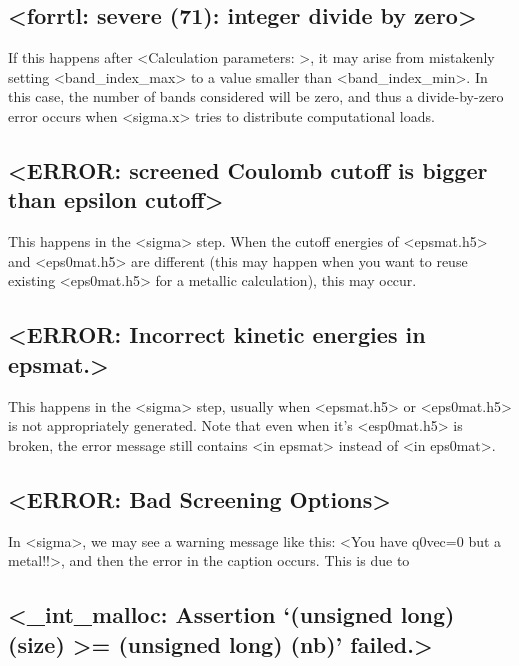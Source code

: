 \documentclass[hyperref, a4paper, 12pt]{report}
\def\texttt#1{<#1>}%
\newcommand{\shortcode}[1]{\texttt{#1}}
\begin{document}
\subsection{\shortcode{forrtl: severe (71): integer divide by zero}}

If this happens after \shortcode{Calculation parameters: },
it may arise from mistakenly setting \shortcode{band_index_max}
to a value smaller than \shortcode{band_index_min}.
In this case, 
the number of bands considered will be zero,
and thus a divide-by-zero error occurs 
when \shortcode{sigma.x} tries to distribute computational loads.

\subsection{\shortcode{ERROR: screened Coulomb cutoff is bigger than epsilon cutoff}}

This happens in the \shortcode{sigma} step.
When the cutoff energies of \shortcode{epsmat.h5} and \shortcode{eps0mat.h5} 
are different 
(this may happen when you want to reuse existing \shortcode{eps0mat.h5} for a metallic calculation),
this may occur. 

\subsection{\shortcode{ERROR: Incorrect kinetic energies in epsmat.}}

This happens in the \shortcode{sigma} step, 
usually when \shortcode{epsmat.h5} or \shortcode{eps0mat.h5} 
is not appropriately generated. 
Note that even when it's \shortcode{esp0mat.h5} is broken, 
the error message still contains \shortcode{in epsmat}
instead of \shortcode{in eps0mat}.

\subsection{\shortcode{ERROR: Bad Screening Options}}

In \shortcode{sigma}, we may see a warning message like this:
\shortcode{You have q0vec=0 but a metal!!},
and then the error in the caption occurs. 
This is due to 

\subsection{\shortcode{_int_malloc: Assertion `(unsigned long) (size) >= (unsigned long) (nb)' failed.}}
\end{document}
